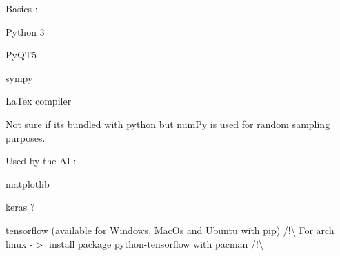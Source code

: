 \begin{DoxyItemize}
\item Basics \+:
\begin{DoxyItemize}
\item Python 3
\item Py\+Q\+T5
\item sympy
\item La\+Tex compiler
\item Not sure if it\textquotesingle{}s bundled with python but num\+Py is used for random sampling purposes.
\end{DoxyItemize}
\item Used by the AI \+:
\begin{DoxyItemize}
\item matplotlib
\item keras ?
\item tensorflow (available for Windows, Mac\+Os and Ubuntu with pip) /!\textbackslash{} For arch linux -\/$>$ install package python-\/tensorflow with pacman /!\textbackslash{} 
\end{DoxyItemize}
\end{DoxyItemize}